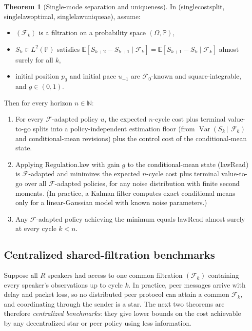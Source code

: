 \documentclass[11pt,a4paper]{article}
\DeclareRobustCommand{\lean}[1]{{\ttfamily\def\_{\textunderscore\allowbreak}#1}}
\newcommand{\E}{\mathbb{E}}
\newcommand{\Prob}{\mathbb{P}}
\theoremstyle{definition}
\newtheorem{theorem}[definition]{Theorem}
\begin{document}
\begin{theorem}[Single-mode separation and uniqueness]
\label{thm:single-sep}
In 
(\lean{single\_cost\_split}, \lean{single\_law\_optimal},
\lean{single\_law\_unique\_ae}), assume:
\begin{itemize}
\item $(\mathcal{F}_k)$ is a filtration on a probability space $(\Omega, \Prob)$,
\item $S_k \in L^2(\Prob)$ satisfies
  $\E[S_{k+2} - S_{k+1} \mid \mathcal{F}_k] =
   \E[S_{k+1} - S_k \mid \mathcal{F}_k]$ almost surely for all $k$,
\item initial position $p_0$ and initial pace $u_{-1}$ are
  $\mathcal{F}_0$-known and square-integrable, and $g \in (0, 1)$.
\end{itemize}
Then for every horizon $n \in \mathbb{N}$:
\begin{enumerate}
\item For every $\mathcal{F}$-adapted policy $u$, the expected $n$-cycle cost
  plus terminal value-to-go splits into a policy-independent estimation floor
  (from $\operatorname{Var}(S_k \mid \mathcal{F}_k)$ and conditional-mean
  revisions) plus the control cost of the conditional-mean state.
\item Applying \lean{Regulation.law} with gain $g$ to the conditional-mean
  state (\lean{lawRead}) is $\mathcal{F}$-adapted and minimizes the expected
  $n$-cycle cost plus terminal value-to-go over all $\mathcal{F}$-adapted
  policies, for any noise distribution with finite second moments. (In
  practice, a Kalman filter computes exact conditional means only for a
  linear-Gaussian model with known noise parameters.)
\item Any $\mathcal{F}$-adapted policy achieving the minimum equals
  \lean{lawRead} almost surely at every cycle $k < n$.
\end{enumerate}
\end{theorem}

\subsection{Centralized shared-filtration benchmarks}

Suppose all $R$ speakers had access to one common filtration $(\mathcal{F}_k)$
containing every speaker's observations up to cycle $k$. In practice, peer
messages arrive with delay and packet loss, so no distributed peer protocol can
attain a common $\mathcal{F}_k$, and coordinating through the sender is a star.
The next two theorems are therefore \emph{centralized benchmarks}: they give
lower bounds on the cost achievable by any decentralized star or peer policy
using less information.
\end{document}
